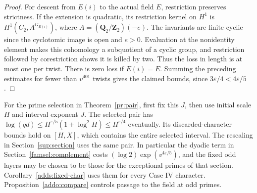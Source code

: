 \begin{proof}
For descent from \(E(i)\) to the actual field \(E\), restriction
preserves strictness. If the extension is quadratic, its
restriction kernel on \(H^1\) is
\(H^1(C_2,A^{G_{E(i)}})\), where \(A=(\mathbf Q_2/\mathbf Z_2)(-e)\).
The invariants are finite cyclic since the cyclotomic image is open
and \(e>0\). Evaluation at the nonidentity element makes this
cohomology a subquotient of a cyclic group, and restriction followed
by corestriction shows it is killed by two. Thus the loss in length
is at most one per twist. There is zero loss if \(E(i)=E\).
Summing the preceding estimates for fewer than \(v^{401}\) twists
gives the claimed bounds, since \(3\varepsilon/4<4\varepsilon/5\).
\end{proof}

For the prime selection in Theorem~\ref{pr:pair}, first fix this
\(J\), then use initial scale \(H\) and interval exponent \(J\).
The selected pair has
\(\log(qd)\le H^{\varepsilon/5}(1+\log^2 H)\le H^{\varepsilon/4}\)
eventually. Its discarded-character bounds hold on \([H,X]\),
which contains the entire selected interval. The rescaling in
Section~\ref{sup:section} uses the same pair. In particular
the dyadic term in Section~\ref{famsel:complement} costs
\((\log 2)\exp(v^{4\varepsilon/5})\), and the fixed odd layers
may be chosen to be those for the exceptional primes of that section.
Corollary~\ref{adds:fixed-char} uses them for every Case IV character.
Proposition~\ref{addo:compare} controls passage to the field at odd primes.

